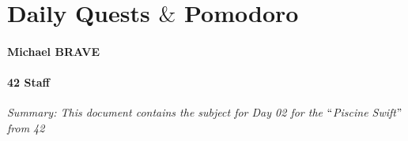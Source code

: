 \documentclass[12pt]{report}
\begin{document}
\vspace{\baselineskip}

\vspace{\baselineskip}

\vspace{\baselineskip}

\vspace{\baselineskip}

\vspace{\baselineskip}
\par

\section*{Daily Quests $\&$  Pomodoro}

\vspace{\baselineskip}

\vspace{\baselineskip}
\paragraph*{Michael BRAVE }
\paragraph*{42 Staff }

\vspace{\baselineskip}

\vspace{\baselineskip}

\vspace{\baselineskip}

\vspace{\baselineskip}
\begin{Center}
\textit{Summary: This document contains the subject for Day 02 for the $``$Piscine Swift$"$  from 42}
\end{Center}\par


\vspace{\baselineskip}

\vspace{\baselineskip}

\vspace{\baselineskip}

\vspace{\baselineskip}
\end{document}
